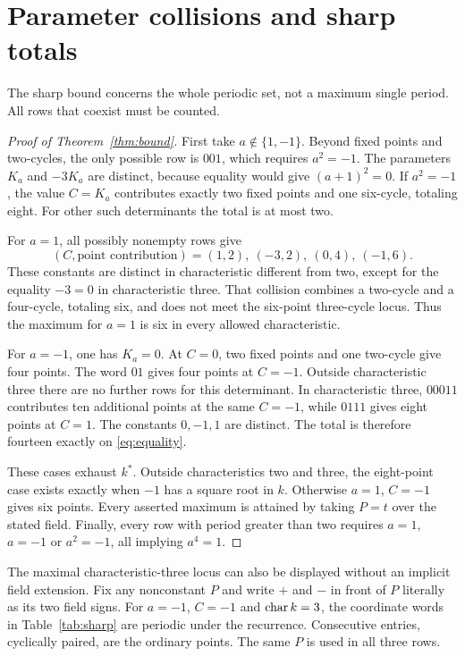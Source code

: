 \section{Parameter collisions and sharp totals}\label{sec:bounds}
The sharp bound concerns the whole periodic set, not a maximum
single period. All rows that coexist must be counted.

\begin{proof}[Proof of Theorem~\ref{thm:bound}]
First take $a\notin\{1,-1\}$. Beyond fixed points and two-cycles,
the only possible row is $001$, which requires $a^2=-1$.
The parameters $K_a$ and $-3K_a$ are distinct, because equality
would give $(a+1)^2=0$. If $a^2=-1$, the value $C=K_a$
contributes exactly two fixed points and one six-cycle, totaling
eight. For other such determinants the total is at most two.

For $a=1$, all possibly nonempty rows give
\begin{equation}\label{eq:a-plus}
 (C,\text{point contribution})=(1,2),\ (-3,2),\ (0,4),\ (-1,6).
\end{equation}
These constants are distinct in characteristic different from two,
except for the equality $-3=0$ in characteristic three.
That collision combines a two-cycle and a four-cycle, totaling
six, and does not meet the six-point three-cycle locus. Thus
the maximum for $a=1$ is six in every allowed characteristic.

For $a=-1$, one has $K_a=0$. At $C=0$, two fixed points
and one two-cycle give four points. The word $01$ gives four
points at $C=-1$. Outside characteristic three there are no
further rows for this determinant. In characteristic three,
$00011$ contributes ten additional points at the same $C=-1$,
while $0111$ gives eight points at $C=1$. The constants
$0,-1,1$ are distinct. The total is therefore fourteen
exactly on \eqref{eq:equality}.

These cases exhaust $k^*$. Outside characteristics two and three,
the eight-point case exists exactly when $-1$ has a square root
in $k$. Otherwise $a=1$, $C=-1$ gives six points.
Every asserted maximum is attained by taking $P=t$ over the
stated field. Finally, every row with period greater than two
requires $a=1$, $a=-1$ or $a^2=-1$, all implying $a^4=1$.
\end{proof}

The maximal characteristic-three locus can also be displayed
without an implicit field extension. Fix any nonconstant $P$
and write $+$ and $-$ in front of $P$ literally as its two
field signs. For $a=-1$, $C=-1$ and $\operatorname{char} k=3$, the coordinate
words in Table~\ref{tab:sharp} are periodic under the recurrence.
Consecutive entries, cyclically paired, are the ordinary points.
The same $P$ is used in all three rows.

